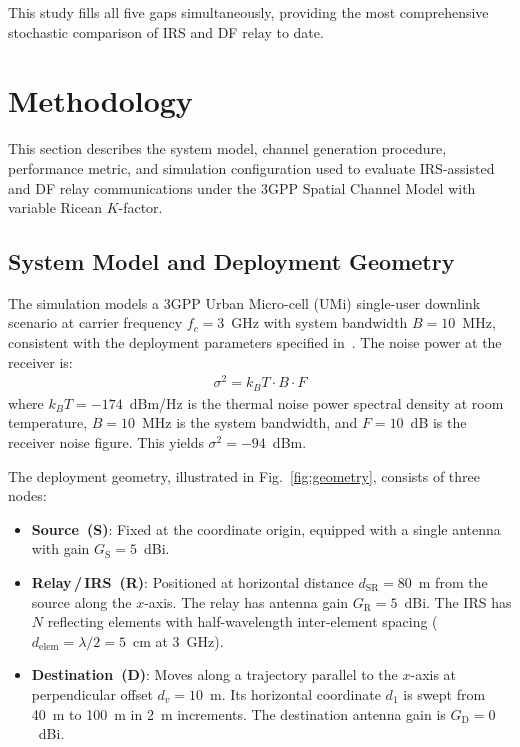 \documentclass[journal]{IEEEtran} %
\begin{document}
This study fills all five gaps simultaneously, providing the most comprehensive stochastic comparison of IRS and DF relay to date.






\section{Methodology}
\label{sec:methodology}

This section describes the system model, channel generation procedure, performance metric, and simulation configuration used to evaluate IRS-assisted and DF relay communications under the 3GPP Spatial Channel Model with variable Ricean $K$-factor.

\subsection{System Model and Deployment Geometry}

The simulation models a 3GPP Urban Micro-cell (UMi) single-user downlink scenario at carrier frequency $f_c = 3$~GHz with system bandwidth $B = 10$~MHz, consistent with the deployment parameters specified in~\cite{bjornson2020irs,3gpp36814}. The noise power at the receiver is:
\begin{align}
    \sigma^2 = k_B T \cdot B \cdot F
    \label{eq:noise_power}
\end{align}
where $k_B T = -174$~dBm/Hz is the thermal noise power spectral density at room temperature, $B = 10$~MHz is the system bandwidth, and $F = 10$~dB is the receiver noise figure. This yields $\sigma^2 = -94$~dBm.

The deployment geometry, illustrated in Fig.~\ref{fig:geometry}, consists of three nodes:
\begin{itemize}[leftmargin=*]
    \item \textbf{Source~(S)}: Fixed at the coordinate origin, equipped with a single antenna with gain $G_{\mathrm{S}} = 5$~dBi.
    \item \textbf{Relay\,/\,IRS~(R)}: Positioned at horizontal distance $d_{\mathrm{SR}} = 80$~m from the source along the $x$-axis. The relay has antenna gain $G_{\mathrm{R}} = 5$~dBi. The IRS has $N$ reflecting elements with half-wavelength inter-element spacing ($d_{\mathrm{elem}} = \lambda/2 = 5$~cm at 3~GHz).
    \item \textbf{Destination~(D)}: Moves along a trajectory parallel to the $x$-axis at perpendicular offset $d_v = 10$~m. Its horizontal coordinate $d_1$ is swept from 40~m to 100~m in 2~m increments. The destination antenna gain is $G_{\mathrm{D}} = 0$~dBi.
\end{itemize}
\end{document}
